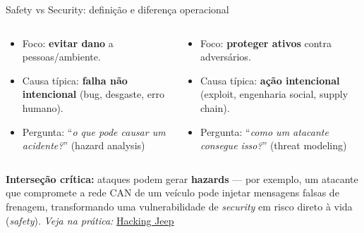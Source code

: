 \documentclass{beamer}
\begin{document}


\begin{frame}{Safety vs Security: definição e diferença operacional}
\vspace{-1.5em}
  \begin{columns}[T,onlytextwidth]
\begin{tcolorbox}[title=Safety (acidental),colback=white]
\begin{itemize}
  \item Foco: \textbf{evitar dano} a pessoas/ambiente.
  \item Causa típica: \textbf{falha não intencional} (bug, desgaste, erro humano).
  \item Pergunta: ``\textit{o que pode causar um acidente?}'' (hazard analysis)
\end{itemize}
\end{tcolorbox}

\begin{tcolorbox}[title=Security (malicioso),colback=white]
\begin{itemize}
  \item Foco: \textbf{proteger ativos} contra adversários.
  \item Causa típica: \textbf{ação intencional} (exploit, engenharia social, supply chain).
  \item Pergunta: ``\textit{como um atacante consegue isso?}'' (threat modeling)
\end{itemize}
\end{tcolorbox}
\end{columns}

\vspace{0.3em}
\small
\textbf{Interseção crítica:} ataques podem gerar \textbf{hazards} --- por exemplo, um atacante que compromete a rede CAN de um veículo pode injetar mensagens falsas de frenagem, transformando uma vulnerabilidade de \textit{security} em risco direto à vida (\textit{safety}).
\vspace{0.3em}
\scriptsize
\textit{Veja na prática:} \href{https://www.youtube.com/watch?v=MK0SrxBC1xs}{Hacking Jeep}
\end{frame}
\end{document}
